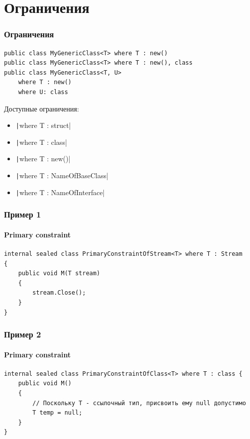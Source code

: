 \documentclass{../../slides-style}
\begin{document}
    \section{Ограничения}
    
    \begin{frame}[fragile]
        \frametitle{Ограничения}
        \begin{verbatim}
public class MyGenericClass<T> where T : new()
public class MyGenericClass<T> where T : new(), class
public class MyGenericClass<T, U> 
    where T : new() 
    where U: class
        \end{verbatim}

        Доступные ограничения:
        \begin{itemize}
            \item \texttt|where T : struct|
            \item \texttt|where T : class|
            \item \texttt|where T : new()|
            \item \texttt|where T : NameOfBaseClass|
            \item \texttt|where T : NameOfInterface|
        \end{itemize}
    \end{frame}

    \begin{frame}[fragile]
        \frametitle{Пример 1}
        \framesubtitle{Primary constraint}
        \begin{footnotesize}
            \begin{verbatim}
internal sealed class PrimaryConstraintOfStream<T> where T : Stream 
{
    public void M(T stream) 
    {
        stream.Close();
    }
}
            \end{verbatim}
        \end{footnotesize}
    \end{frame}

    \begin{frame}[fragile]
        \frametitle{Пример 2}
        \framesubtitle{Primary constraint}
        \begin{footnotesize}
            \begin{verbatim}
internal sealed class PrimaryConstraintOfClass<T> where T : class {
    public void M() 
    {
        // Поскольку T - ссылочный тип, присвоить ему null допустимо
        T temp = null;
    }
}
            \end{verbatim}
        \end{footnotesize}
    \end{frame}
\end{document}
